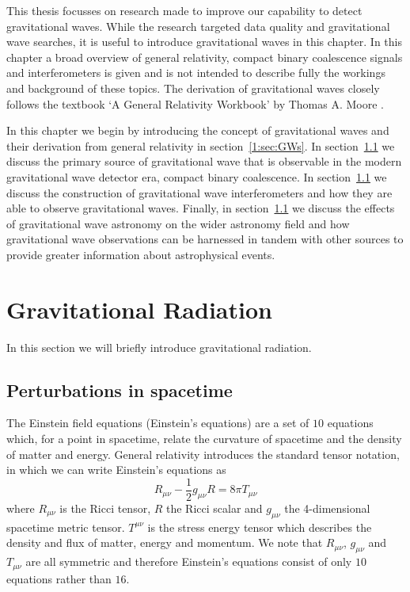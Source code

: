 
This thesis focusses on research made to improve our capability to detect gravitational waves. While the research targeted data quality and gravitational wave searches, it is useful to introduce gravitational waves in this chapter. In this chapter a broad overview of general relativity, compact binary coalescence signals and interferometers is given and is not intended to describe fully the workings and background of these topics. The derivation of gravitational waves closely follows the textbook `A General Relativity Workbook' by Thomas A. Moore \cite{moore_2013}.

In this chapter we begin by introducing the concept of gravitational waves and their derivation from general relativity in section~\ref{1:sec:GWs}. In section~\ref{} we discuss the primary source of gravitational wave that is observable in the modern gravitational wave detector era, compact binary coalescence. In section~\ref{} we discuss the construction of gravitational wave interferometers and how they are able to observe gravitational waves. Finally, in section~\ref{} we discuss the effects of gravitational wave astronomy on the wider astronomy field and how gravitational wave observations can be harnessed in tandem with other sources to provide greater information about astrophysical events.

\section{\label{1:sec:gravitational-radiation}Gravitational Radiation}

In this section we will briefly introduce gravitational radiation.

\subsection{\label{2:sec:perturbations}Perturbations in spacetime}

The Einstein field equations (Einstein's equations) are a set of $10$ equations which, for a point in spacetime, relate the curvature of spacetime and the density of matter and energy. General relativity introduces the standard tensor notation, in which we can write Einstein's equations as
%
\begin{equation}
   R_{\mu \nu} - \frac{1}{2}g_{\mu \nu}R = 8 \pi T_{\mu \nu}
   \label{2:eqn:EFE}
\end{equation}
%
where $R_{\mu \nu}$ is the Ricci tensor, $R$ the Ricci scalar and $g_{\mu \nu}$ the 4-dimensional spacetime metric tensor. $T^{\mu \nu}$ is the stress energy tensor which describes the density and flux of matter, energy and momentum. We note that $R_{\mu \nu}$, $g_{\mu \nu}$ and $T_{\mu \nu}$ are all symmetric and therefore Einstein's equations consist of only $10$ equations rather than $16$.

